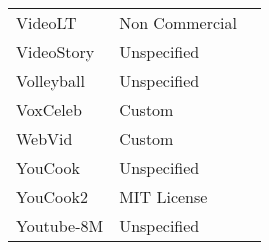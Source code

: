 \begin{longtable}{p{5cm}|p{5cm}|p{5cm}}
VideoLT & Non Commercial & \autocite{zhangVideoLTLargescaleLongtailed2021} \\
VideoStory & Unspecified & \autocite{habibianVideoStoryNewMultimedia2014} \\
Volleyball & Unspecified & \autocite{ibrahimHierarchicalDeepTemporal2016} \\
VoxCeleb & Custom & \autocite{nagraniVoxCelebLargescaleSpeaker2018} \\
WebVid & Custom & \autocite{bainFrozenTimeJoint2022} \\
YouCook & Unspecified & \autocite{dasThousandFramesJust2013} \\
YouCook2 & MIT License & \autocite{zhouAutomaticLearningProcedures2017} \\
Youtube-8M & Unspecified & \autocite{abu-el-haijaYouTube8MLargeScaleVideo2016} \\
\end{longtable}